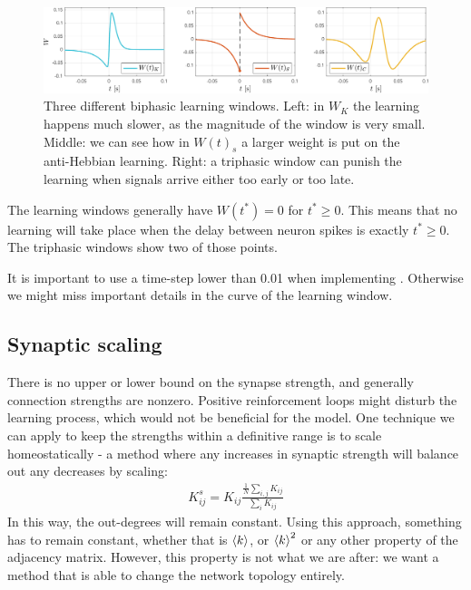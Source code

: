\begin{figure}[H]
\centering
\includegraphics[width = \textwidth]{../Figures/Learning/LearningWindows.pdf}
\caption{Three different biphasic learning windows. Left: in $W_K$ the learning happens much slower, as the magnitude of the window is very small. Middle: we can see how in $W(t)_s$ a larger weight is put on the anti-Hebbian learning. Right: a triphasic window can punish the learning when signals arrive either too early or too late.}
\label{fig:LearningWindows}
\end{figure}

The learning windows generally have $W(t^{\ast}) = 0$ for $t^{\ast} \geq 0$. This means that no learning will take place when the delay between neuron spikes is exactly $t^{\ast} \geq 0$. The triphasic windows show two of those points. 

It is important to use a time-step lower than 0.01 when implementing \STDP. Otherwise we might miss important details in the curve of the learning window.


\subsection{Synaptic scaling}
There is no upper or lower bound on the synapse strength, and generally connection strengths are nonzero. Positive reinforcement loops might disturb the learning process, which would not be beneficial for the model. One technique we can apply to keep the strengths within a definitive range is to scale homeostatically - a method where any increases in synaptic strength will balance out any decreases by scaling:
\begin{align}
K_{ij}^s = K_{ij} \frac{\frac{1}{N} \sum_{i,j} K_{ij}}{\sum_{i} K_{ij}}
\end{align}
In this way, the out-degrees will remain constant. Using this approach, something has to remain constant, whether that is ${\langle k\rangle}$, or ${\langle k\rangle}^2$ or any other property of the adjacency matrix. However, this property is not what we are after: we want a method that is able to change the network topology entirely.


